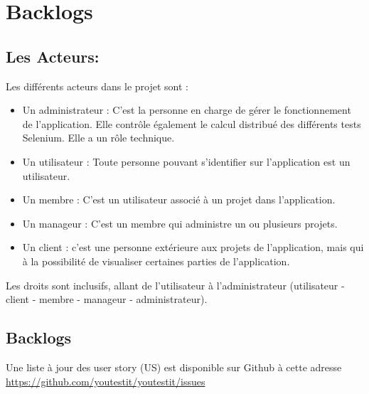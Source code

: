 \section{Backlogs}

	\subsection{Les Acteurs:}
		 Les différents acteurs dans le projet sont :
		 \begin{itemize}
		 		\item Un administrateur : C'est la personne en charge de gérer le fonctionnement de l'application. 
		 		Elle contrôle également le calcul distribué des différents tests Selenium. Elle a un rôle technique.
		 		
		 		\item Un utilisateur :  Toute personne pouvant s'identifier sur l'application est un utilisateur.
		 		
		 		\item Un membre : C'est un utilisateur associé à un projet dans l'application.
		 		
		 		\item Un manageur : C'est un membre qui administre un ou plusieurs projets.
		 		
		 		\item Un client : c'est une personne extérieure aux projets de l'application, mais qui à la possibilité de 
		 											visualiser certaines parties de l'application.
		 \end{itemize}

			Les droits sont inclusifs, allant de l'utilisateur à l'administrateur (utilisateur - client - membre - manageur - administrateur).

	\subsection{Backlogs}
	
Une liste à jour des user story (US) est disponible sur Github à cette adresse \href{https://github.com/youtestit/youtestit/issues?labels=features&sort=created&direction=desc&state=open&page=1}{https://github.com/youtestit/youtestit/issues}

